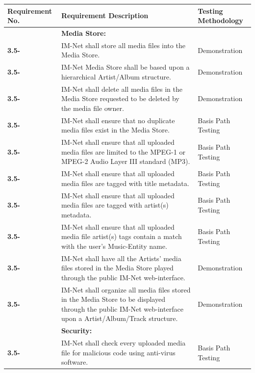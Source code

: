 \documentclass[letterpaper,12pt]{article}
\newcounter{rcounter}							%
\newcommand\rnumber{\stepcounter{rcounter}\arabic{rcounter}}
\begin{document}
{\begin{center}
\begin{tabular}{|l|p{4in}|p{2in}|}
\end{tabular} 
\end{center}

\setcounter{rcounter}{0}
\begin{center}
\begin{tabular}{|l|p{4in}|p{2in}|}
\hline 
Requirement No. & Requirement Description & Testing Methodology \\
\hline
& \textbf{Media Store:} & \\
\hline
\textbf{3.5-\rnumber} & IM-Net shall store all media files into the Media Store. & Demonstration \\ 
\hline
\textbf{3.5-\rnumber} & IM-Net Media Store shall be based upon a hierarchical Artist/Album structure. & Demonstration \\ 
\hline
\textbf{3.5-\rnumber} & IM-Net shall delete all media files in the Media Store requested to be deleted by the media file owner. & Demonstration \\ 
\hline
\textbf{3.5-\rnumber} & IM-Net shall ensure that no duplicate media files exist in the Media Store. & Basis Path Testing \\ 
\hline
\textbf{3.5-\rnumber} & IM-Net shall ensure that all uploaded media files are limited to the MPEG-1 or MPEG-2 Audio Layer III standard (MP3). & Basis Path Testing \\ 
\hline
\textbf{3.5-\rnumber} & IM-Net shall ensure that all uploaded media files are tagged with title metadata. & Basis Path Testing \\ 
\hline
\textbf{3.5-\rnumber} & IM-Net shall ensure that all uploaded media files are tagged with artist(s) metadata. & Basis Path Testing \\ 
\hline
\textbf{3.5-\rnumber} & IM-Net shall ensure that all uploaded media file artist(s) tags contain a match with the user's Music-Entity name. & Basis Path Testing \\ 
\hline
\textbf{3.5-\rnumber} & IM-Net shall have all the Artists' media files stored in the Media Store played through the public IM-Net web-interface. & Demonstration \\ 
\hline
\textbf{3.5-\rnumber} & IM-Net shall organize all media files stored in the Media Store to be displayed through the public IM-Net web-interface upon a Artist/Album/Track structure. & Demonstration \\ 
\hline
& \textbf{Security:} & \\
\hline
\textbf{3.5-\rnumber} & IM-Net shall check every uploaded media file for malicious code using anti-virus software. & Basis Path Testing \\ 

\end{tabular}
\end{center}}
\end{document}
